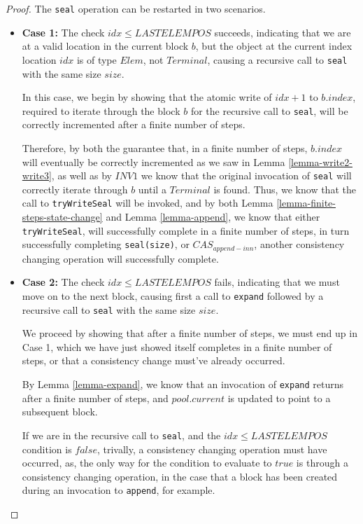 \documentclass[runningheads,a4paper]{llncs}
\begin{document}
\begin{proof}
The \verb=seal= operation can be restarted in two scenarios. 

\begin{itemize}

\item \textbf{Case 1:} The check $idx \leq LASTELEMPOS$ succeeds, indicating
that we are at a valid location in the current block $b$, but the object at
the current index location $idx$ is of type $Elem$, not $Terminal$, causing a
recursive call to \verb=seal= with the same size $size$.

In this case, we begin by showing that the atomic write of $idx+1$ to
$b.index$, required to iterate through the block $b$ for the recursive call to
\verb=seal=, will be correctly incremented after a finite number of steps. 

Therefore, by both the guarantee that, in a finite number of steps, $b.index$
will eventually be correctly incremented as we saw in Lemma  
\ref{lemma-write2-write3}, as well as by $INV1$ we know that the original invocation of
\verb=seal= will correctly iterate through $b$ until a $Terminal$ is found.
Thus, we know that the call to \verb=tryWriteSeal= will be invoked, and by
both Lemma \ref{lemma-finite-steps-state-change} and Lemma \ref{lemma-append},
we know that either \verb=tryWriteSeal=, will successfully complete in a
finite number of steps, in turn successfully completing \verb=seal(size)=, or
$CAS_{append-inn}$, another consistency changing operation will successfully
complete.

\item \textbf{Case 2:} The check $idx \leq LASTELEMPOS$ fails, indicating that
we must move on to the next block, causing first a call to \verb=expand=
followed by a recursive call to \verb=seal= with the same size $size$.

We proceed by showing that after a finite number of steps, we must end up in
Case 1, which we have just showed itself completes in a finite number of
steps, or that a consistency change must've already occurred. 

By Lemma \ref{lemma-expand}, we know that an invocation of \verb=expand=
returns after a finite number of steps, and $pool.current$ is updated to point
to a subsequent block.

If we are in the recursive call to \verb=seal=, and the $idx \leq LASTELEMPOS$
condition is $false$, trivally, a consistency changing operation must have
occurred, as, the only way for the condition to evaluate to $true$ is through
a consistency changing operation, in the case that a block has been created
during an invocation to \verb=append=, for example.


\end{itemize}
\end{proof}
\end{document}
